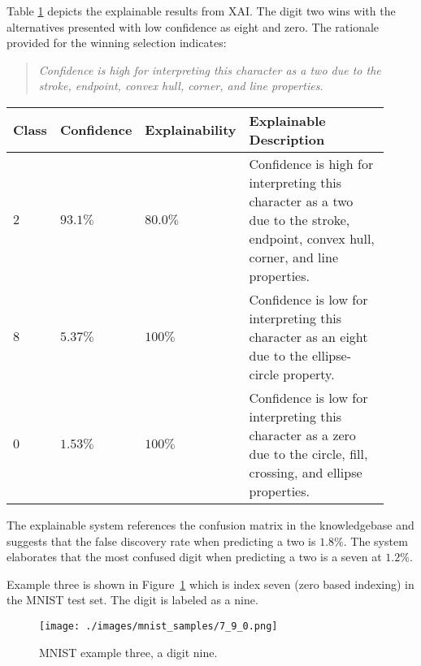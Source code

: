 Table \ref{table:mnist_example2_explanation} depicts the explainable results
from XAI. The digit two wins with the alternatives presented with low confidence
as eight and zero.  The rationale provided for the winning selection indicates:

\begin{quote}
    \textit{Confidence is high for interpreting this character as a two due to the stroke, endpoint, convex hull, corner, and line properties.}
\end{quote}

\begin{table}[H]
    \renewcommand{\arraystretch}{1.3}
     \label{table:mnist_example2_explanation}
    \begin{center}
    \begin{tabular}{| m{0.06\linewidth} | m{0.14\linewidth} | m{0.17\linewidth} | m{0.55\linewidth} |}
    \hline
     Class & Confidence & Explainability & Explainable Description \\
    \hline \hline
    $2$ & $93.1\%$ & $80.0\%$ & Confidence is high for interpreting this character as a two due to the stroke, endpoint, convex hull, corner, and line properties. \\ 
    \hline
    $8$ & $5.37\%$ & $100\%$ & Confidence is low for interpreting this character as an eight due to the ellipse-circle property. \\
    \hline
    $0$ & $1.53\%$ & $100\%$ & Confidence is low for interpreting this character as a zero due to the circle, fill, crossing, and ellipse properties. \\
    \hline
    \end{tabular}
    \end{center}
\end{table}

The explainable system references the confusion matrix in the knowledgebase and
suggests that the false discovery rate when predicting a two is $1.8\%$. The
system elaborates that the most confused digit when predicting a two is a seven
at $1.2\%$.

Example three is shown in Figure~\ref{fig:mnist_example3} which is index seven (zero
based indexing) in the MNIST test set. The digit is labeled as a nine.

\begin{figure}[H]
    \centerline{\texttt{[image: ./images/mnist\_samples/7\_9\_0.png]}}
    \caption{MNIST example three, a digit nine.}
    \label{fig:mnist_example3}
\end{figure}

